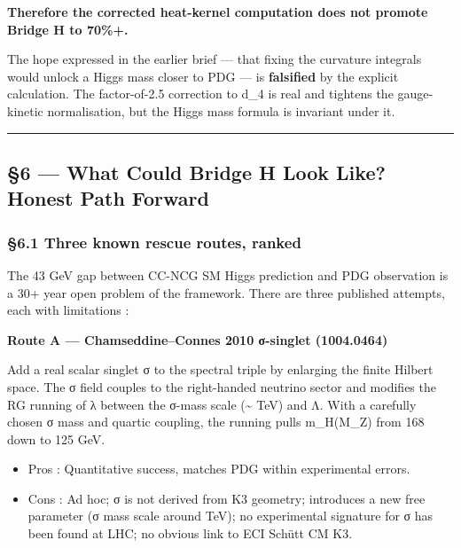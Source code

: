 \documentclass[
  11pt,
  a4paper,
]{article}
\providecommand{\tightlist}{\setlength{\itemsep}{0pt}\setlength{\parskip}{0pt}}
\providecommand{\tightlist}{%
  \setlength{\itemsep}{0pt}\setlength{\parskip}{0pt}}
\begin{document}
\textbf{Therefore the corrected heat-kernel computation does not promote Bridge H to 70\%+.}

The hope expressed in the earlier brief --- that fixing the curvature integrals would unlock a Higgs mass closer to PDG --- is \textbf{falsified} by the explicit calculation. The factor-of-2.5 correction to d\_4 is real and tightens the gauge-kinetic normalisation, but the Higgs mass formula is invariant under it.

\begin{center}\rule{0.5\linewidth}{0.5pt}\end{center}

\hypertarget{what-could-bridge-h-look-like-honest-path-forward}{%
\subsection{§6 --- What Could Bridge H Look Like? Honest Path Forward}\label{what-could-bridge-h-look-like-honest-path-forward}}

\hypertarget{three-known-rescue-routes-ranked}{%
\subsubsection{§6.1 Three known rescue routes, ranked}\label{three-known-rescue-routes-ranked}}

The 43 GeV gap between CC-NCG SM Higgs prediction and PDG observation is a 30+ year open problem of the framework. There are three published attempts, each with limitations :

\textbf{Route A --- Chamseddine--Connes 2010 σ-singlet (1004.0464)}

Add a real scalar singlet σ to the spectral triple by enlarging the finite Hilbert space. The σ field couples to the right-handed neutrino sector and modifies the RG running of λ between the σ-mass scale (\textasciitilde{} TeV) and Λ. With a carefully chosen σ mass and quartic coupling, the running pulls m\_H(M\_Z) from 168 down to 125 GeV.

\begin{itemize}
\tightlist
\item
  Pros : Quantitative success, matches PDG within experimental errors.
\item
  Cons : Ad hoc; σ is not derived from K3 geometry; introduces a new free parameter (σ mass scale around TeV); no experimental signature for σ has been found at LHC; no obvious link to ECI Schütt CM K3.
\end{itemize}
\end{document}
